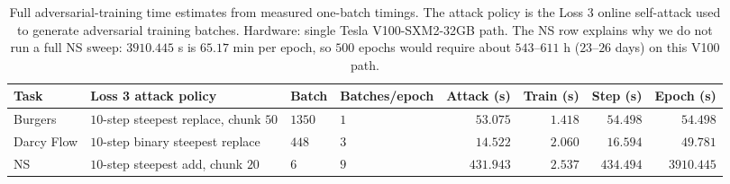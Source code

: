 ﻿\documentclass[letterpaper]{article} %
\begin{document}
\begin{table}[t]
\centering
\footnotesize
\caption{Full adversarial-training time estimates from measured
one-batch timings. The attack policy is the Loss 3 online self-attack used to
generate adversarial training batches. Hardware: single Tesla V100-SXM2-32GB path.
The NS row explains why we do not run a full NS sweep: $3910.445$ s is
$65.17$ min per epoch, so $500$ epochs would require about $543$--$611$ h
($23$--$26$ days) on this V100 path.}
\label{tab:adv_training_epoch_timing}
\setlength{\tabcolsep}{2.4pt}
\begin{tabular}{llllrrrr}
\toprule
Task & Loss 3 attack policy & Batch & Batches/epoch & Attack (s) & Train (s) & Step (s) & Epoch (s) \\
\midrule
Burgers & $10$-step steepest replace, chunk $50$ & $1350$ & $1$ & $53.075$ & $1.418$ & $54.498$ & $54.498$ \\
Darcy Flow & $10$-step binary steepest replace & $448$ & $3$ & $14.522$ & $2.060$ & $16.594$ & $49.781$ \\
NS & $10$-step steepest add, chunk $20$ & $6$ & $9$ & $431.943$ & $2.537$ & $434.494$ & $3910.445$ \\
\bottomrule
\end{tabular}
\end{table}

\clearpage
{}
\end{document}
